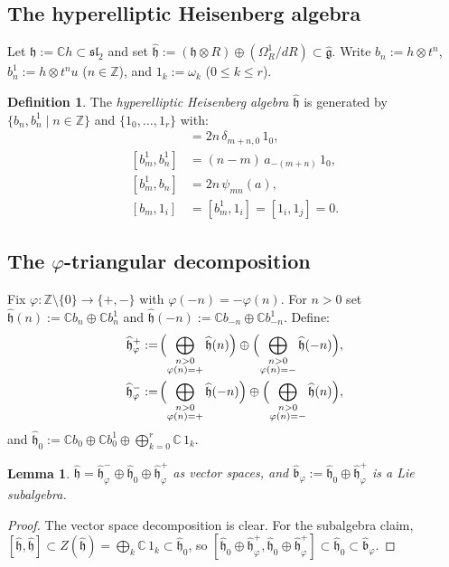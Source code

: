 \documentclass{amsart}
\newcommand{\Cx}{\mathbb{C}}
\newcommand{\Z}{\mathbb{Z}}
\newcommand{\g}{\mathfrak{g}}
\newcommand{\h}{\mathfrak{h}}
\newcommand{\sltwo}{\mathfrak{sl}_2}
\newcommand{\wh}[1]{\widehat{#1}}
\newcommand{\whg}{\wh{\g}}
\newcommand{\whh}{\wh{\h}}
\newtheorem{lemma}[theorem]{Lemma}
\theoremstyle{definition}
\newtheorem{definition}[theorem]{Definition}
\theoremstyle{remark}
\numberwithin{equation}{section}
\begin{document}
\subsection{The hyperelliptic Heisenberg algebra}
Let $\h:=\Cx h\subset\sltwo$ and set
$\whh:=(\h\otimes R)\oplus(\Omega_R^1/dR)\subset\whg$.
Write $b_n:=h\otimes t^n$, $b_n^1:=h\otimes t^nu$ ($n\in\Z$), and
$1_k:=\omega_k$ ($0\le k\le r$).
\begin{definition}\label{def:heis}
The \emph{hyperelliptic Heisenberg algebra} $\whh$ is generated by
$\{b_n,b_n^1\mid n\in\Z\}$ and $\{1_0,\dots,1_r\}$ with:
\begin{align}
[b_m,b_n]     &=2n\,\delta_{m+n,0}\,1_0,\label{eq:heis1}\\
[b_m^1,b_n^1] &=(n-m)\,a_{-(m+n)}\,1_0,\label{eq:heis2}\\
[b_m^1,b_n]   &=2n\,\psi_{mn}(a),\label{eq:heis3}\\
[b_m,1_i]     &=[b_m^1,1_i]=[1_i,1_j]=0.\label{eq:heis4}
\end{align}
\end{definition}
\subsection{The $\varphi$-triangular decomposition}
Fix $\varphi\colon\Z\setminus\{0\}\to\{+,-\}$ with $\varphi(-n)=-\varphi(n)$.
For $n>0$ set $\whh(n):=\Cx b_n\oplus\Cx b_n^1$ and
$\whh(-n):=\Cx b_{-n}\oplus\Cx b_{-n}^1$.  Define:
\begin{align}
\whh_\varphi^+
&:=\!\Bigl(\bigoplus_{\substack{n>0\\\varphi(n)=+}}\whh(n)\Bigr)
   \oplus\Bigl(\bigoplus_{\substack{n>0\\\varphi(n)=-}}\whh(-n)\Bigr),
  \label{eq:phi-plus}\\
\whh_\varphi^-
&:=\!\Bigl(\bigoplus_{\substack{n>0\\\varphi(n)=+}}\whh(-n)\Bigr)
   \oplus\Bigl(\bigoplus_{\substack{n>0\\\varphi(n)=-}}\whh(n)\Bigr),
  \label{eq:phi-minus}
\end{align}
and $\whh_0:=\Cx b_0\oplus\Cx b_0^1\oplus\bigoplus_{k=0}^r\Cx\,1_k$.
\begin{lemma}\label{lem:triangular-decomp}
$\whh=\whh_\varphi^-\oplus\whh_0\oplus\whh_\varphi^+$ as vector spaces,
and $\wh{\mathfrak b}_\varphi:=\whh_0\oplus\whh_\varphi^+$ is a Lie
subalgebra.
\end{lemma}
\begin{proof}
The vector space decomposition is clear.  For the subalgebra claim,
$[\whh,\whh]\subset Z(\whh)=\bigoplus_k\Cx\,1_k\subset\whh_0$, so
$[\whh_0\oplus\whh_\varphi^+,\whh_0\oplus\whh_\varphi^+]\subset\whh_0
\subset\wh{\mathfrak b}_\varphi$.
\end{proof}
\end{document}
